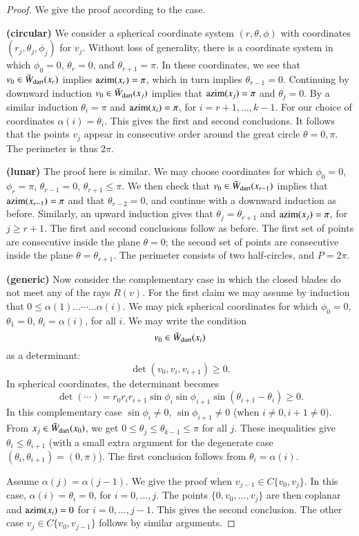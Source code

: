 \begin{proof}  We give the proof according to the case.

{\bf (circular)} We consider a spherical coordinate system $(r,\theta,\phi)$ with coordinates $(r_j,\theta_j,\phi_j)$ for $v_j$.  Without loss of generality, there is a coordinate system in which $\phi_0=0$, $\theta_r=0$, and $\theta_{r+1}=\pi$.  In these coordinates, we see that $v_0\in\bar W_{\text{dart}}(x_r)$ implies ${\operatorname{azim}}(x_r)=\pi$, which in turn implies $\theta_{r-1}=0$.  Continuing by downward induction $v_0\in \bar W_{\text{dart}}(x_j)$ implies that ${\operatorname{azim}}(x_j)=\pi$ and $\theta_j=0$.  By a similar induction $\theta_i=\pi$ and ${\operatorname{azim}}(x_i)=\pi$, for $i=r+1,\ldots,k-1$.  For our choice of coordinates $\alpha(i)=\theta_i$.  This gives the first and second conclusions.  It follows that the points $v_j$ appear in consecutive order around the great circle $\theta=0,\pi$.  The perimeter is thus $2\pi$.

{\bf (lunar)}  The proof here is similar.  We may choose coordinates for which $\phi_0=0$, $\phi_r=\pi$, $\theta_{r-1}=0$, $\theta_{r+1}\le\pi$.  We then check that $v_0\in \bar W_{\text{dart}}(x_{r-1})$ implies that ${\operatorname{azim}}(x_{r-1})=\pi$ and that $\theta_{r-2}=0$, and continue with a downward induction as before.  Similarly, an upward induction gives that $\theta_j=\theta_{r+1}$ and ${\operatorname{azim}}(x_j)=\pi$, for $j\ge r+1$.  The first and second conclusions follow as before.  The first set of points are consecutive inside the plane $\theta=0$; the second set of points are consecutive inside the plane $\theta=\theta_{r+1}$.  The perimeter consists of two half-circles, and $P=2\pi$.

{\bf (generic)} Now consider the complementary case in which the closed blades do not meet any of the rays $R(v)$.  For the first claim we may assume by induction that $0\le \alpha(1)\ldots\cdots\ldots \alpha(i)$.  We may pick spherical coordinates for which $\phi_0=0$, $\theta_1=0$, $\theta_i=\alpha(i)$, for all $i$.  We may write the condition
$$
v_0\in \bar W_{\text{dart}}(x_i)
$$
as a determinant:
$$
\det(v_0,v_i,v_{i+1})\ge 0.
$$
In spherical coordinates, the determinant becomes
$$
\det(\cdots)= r_0r_ir_{i+1}\sin\phi_i\sin\phi_{i+1}\sin(\theta_{i+1}-\theta_i)\ge0.
$$
In this complementary case $\sin\phi_i\ne0$, $\sin\phi_{i+1}\ne0$ (when $i\ne 0,i+1\ne 0$).  From $x_j\in \bar W_{\text{dart}}(x_0)$, we get $0\le\theta_j\le\theta_{k-1}\le\pi$ for all $j$.  These inequalities give $\theta_i\le\theta_{i+1}$ (with a small extra argument for the degenerate case $(\theta_i,\theta_{i+1})=(0,\pi)$).  The first conclusion follows from $\theta_i=\alpha(i)$.

Assume $\alpha(j)=\alpha(j-1)$.  We give the proof when $v_{j-1}\in C\{v_0,v_j\}$.    In this case, $\alpha(i)=\theta_i=0$, for $i=0,\ldots,j$.  The points $\{0,v_0,\ldots,v_j\}$ are then coplanar and ${\operatorname{azim}}(x_i)=0$ for $i=0,\ldots,j-1$.  This gives the second conclusion. The other case $v_j\in C\{v_0,v_{j-1}\}$ follows by similar arguments.
\end{proof}

